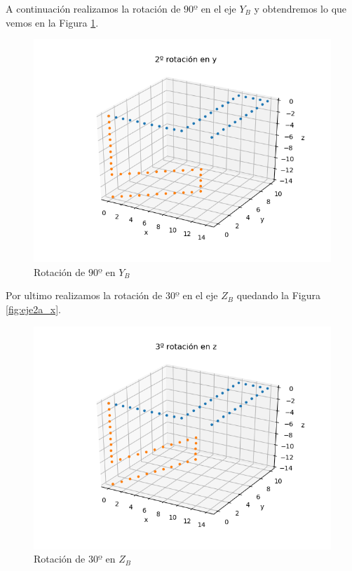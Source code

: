 \documentclass[12pt,a4paper]{report}
\begin{document}
A continuación realizamos la rotación de $90º$ en el eje $Y_B$ y obtendremos lo que vemos en la Figura \ref{fig:eje2a_y}.
\begin{figure}[H]
	\centering
	\includegraphics[width=0.7\linewidth]{img/eje2a_y.png}
	\caption{Rotación de $90º$ en $Y_B$}
	\label{fig:eje2a_y}
\end{figure}
Por ultimo realizamos la rotación de $30º$ en el eje $Z_B$ quedando la Figura \ref{fig:eje2a_x}.
\begin{figure}[H]
	\centering
	\includegraphics[width=0.7\linewidth]{img/eje2a_z.png}
	\caption{Rotación de $30º$ en $Z_B$}
	\label{fig:eje2a_z}
\end{figure}
\end{document}
